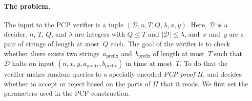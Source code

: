 \documentclass[11pt]{article}
\theoremstyle{definition}
\DeclareMathOperator{\poly}{poly}
\newcommand{\decider}{\mathcal{D}}
\newcommand{\circuit}{\mathcal{C}}
\newcommand{\qlen}{Q}
\newcommand{\tnote}[1]{}
\newcommand{\jnote}[1]{}
\begin{document}
\paragraph{The problem.}
The input to the PCP verifier is a tuple $(\decider, n, T, \qlen, \lambda, x,
y)$.
Here, $\decider$ is a decider, $n$, $T$, $\qlen$, and $\lambda$ are integers
with $\qlen \leq T$ and $|\decider| \leq \lambda$, and~$x$ and~$y$ are a pair of
strings of length at most~$\qlen$ each.
The goal of the verifier is to check whether there exists two
strings~$a_{\mathrm{prefix}}$ and~$b_{\mathrm{prefix}}$ of length at most~$T$
such that $\decider$ halts on input
$(n,x,y,a_{\mathrm{prefix}},b_{\mathrm{prefix}})$ in time at most~$T$.
To do that the verifier makes random queries to a specially encoded \emph{PCP
  proof} $\Pi$, and decides whether to accept or reject based on the parts of
$\Pi$ that it reads.
We first set the parameters used in the PCP construction.
\end{document}
